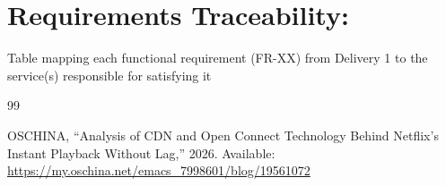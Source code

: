 \documentclass{article}
\begin{document}
\section{Requirements Traceability:}
Table mapping each functional requirement (FR-XX) from Delivery 1 to the service(s) responsible for satisfying it


\begin{thebibliography}{99}

OSCHINA,
``Analysis of CDN and Open Connect Technology Behind Netflix's Instant
Playback Without Lag,”
2026.
Available:
\url{https://my.oschina.net/emacs_7998601/blog/19561072}


\end{thebibliography}
\end{document}
